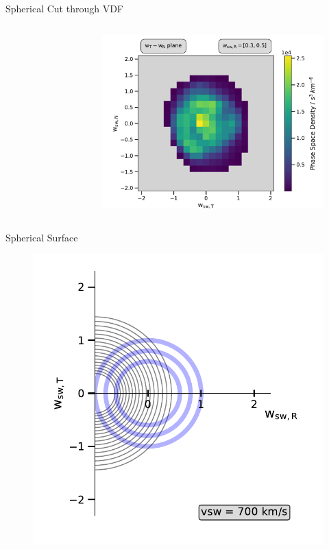\documentclass{beamer}
\begin{document}
\begin{frame}{Spherical Cut through VDF}
\begin{columns}
\begin{figure}
	\end{figure}
	\column{6.5cm}
	\begin{figure}
	\includegraphics[scale=.45]{Pics/cart_50_ps_R.pdf}
	\end{figure}
\column{.5cm}
\end{columns}
\end{frame}



\begin{frame}{Spherical Surface}
\begin{figure}
	\includegraphics[scale=.65]{Pics/cov.pdf}
\end{figure}
\end{frame}
\end{document}
